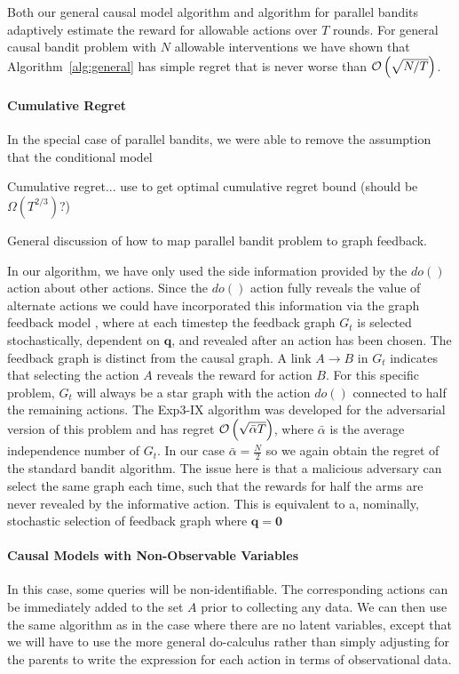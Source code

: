 Both our general causal model algorithm and algorithm for parallel bandits adaptively estimate the reward for allowable actions over $T$ rounds.
For general causal bandit problem with $N$ allowable interventions we have shown that Algorithm~\ref{alg:general} has simple regret that is never worse than $\mathcal{O}\left( \sqrt{N/T} \right)$.

\paragraph{Cumulative Regret}
In the special case of parallel bandits, we were able to remove the assumption that the conditional model

Cumulative regret... use \citep{wu2015online} to get optimal cumulative regret bound (should be $\Omega(T^{2/3})$?)

General discussion of how to map parallel bandit problem to graph feedback.

In our algorithm, we have only used the side information provided by the $do()$ action about other actions. Since the $do()$ action fully reveals the value of alternate actions we could have incorporated this information via the graph feedback model \cite{Mannor2011}, where at each timestep the feedback graph $G_t$ is selected stochastically, dependent on $\boldsymbol{q}$, and revealed after an action has been chosen. The feedback graph is distinct from the causal graph. A link $A \rightarrow B$ in $G_t$ indicates that selecting the action $A$ reveals the reward for action $B$. For this specific problem, $G_t$ will always be a star graph with the action $do()$ connected to half the remaining actions. The Exp3-IX algorithm \cite{Kocak2014} was developed for the adversarial version of this problem and has regret $\mathcal{O}\left( \sqrt{\bar{\alpha}T} \right)$, where $\bar{\alpha}$ is the average independence number of $G_t$. In our case $\bar{\alpha} = \frac{N}{2}$ so we again obtain the regret of the standard bandit algorithm. The issue here is that a malicious adversary can select the same graph each time, such that the rewards for half the arms are never revealed by the informative action. This is equivalent to a, nominally, stochastic selection of feedback graph where $\boldsymbol{q} = \boldsymbol{0}$


\paragraph{Causal Models with Non-Observable Variables}
In this case, some queries will be non-identifiable. The corresponding actions can be immediately added to the set $A$ prior to collecting any data. We can then use the same algorithm as in the case where there are no latent variables, except that we will have to use the more general do-calculus rather than simply adjusting for the parents to write the expression for each action in terms of observational data. 
% 

